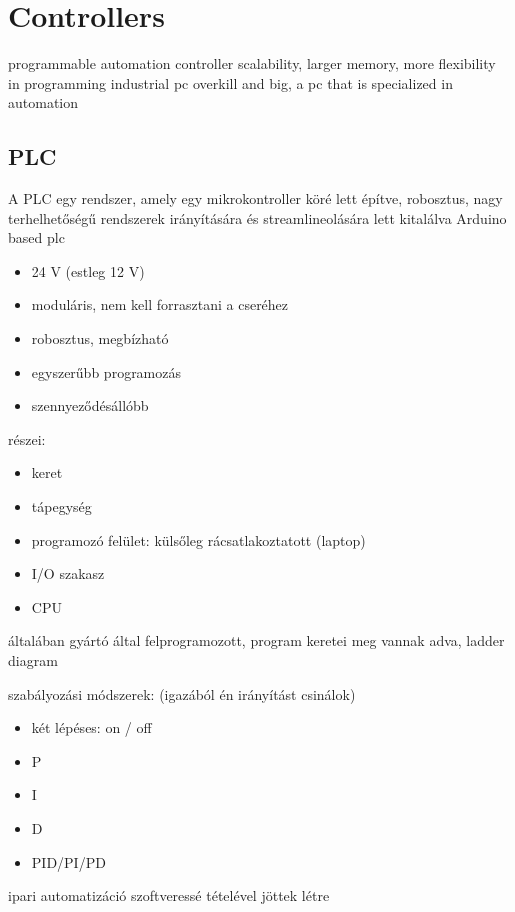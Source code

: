 \documentclass{article}
\begin{document}
	\section{Controllers}
	
	programmable automation controller scalability, larger memory, more flexibility in programming
	industrial pc overkill and big, a pc that is specialized in automation
		
	\subsection{PLC}
	
	A PLC egy rendszer, amely egy mikrokontroller köré lett építve, robosztus, nagy terhelhetőségű rendszerek irányítására és streamlineolására lett kitalálva
	Arduino based plc
	
	\begin{itemize}
		\item 24 V (estleg 12 V)
		\item moduláris, nem kell forrasztani a cseréhez
		\item robosztus, megbízható
		\item egyszerűbb programozás
		\item szennyeződésállóbb
	\end{itemize}
	
	részei:
	\begin{itemize}
		\item keret
		\item tápegység
		\item programozó felület: külsőleg rácsatlakoztatott (laptop)
		\item I/O szakasz
		\item CPU
	\end{itemize}
	
	általában gyártó által felprogramozott, program keretei meg vannak adva, ladder diagram
	
	szabályozási módszerek: (igazából én irányítást csinálok)
	\begin{itemize}
		\item két lépéses: on / off
		\item P
		\item I
		\item D
		\item PID/PI/PD
	\end{itemize}	
	
	
	ipari automatizáció szoftveressé tételével jöttek létre
	
\end{document}
